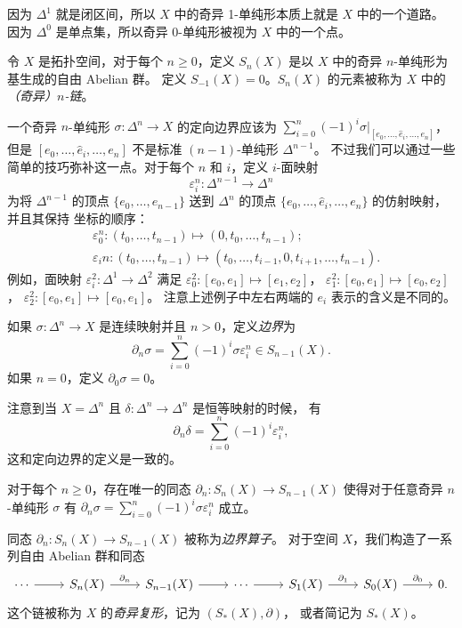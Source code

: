 \documentclass[fontset=none]{Notes}
\begin{document}
因为 $\Delta^1$ 就是闭区间，所以 $X$ 中的奇异 1-单纯形本质上就是 $X$
中的一个道路。因为 $\Delta^0$ 是单点集，所以奇异 0-单纯形被视为 $X$
中的一个点。

\begin{definition}
  令 $X$ 是拓扑空间，对于每个 $n\geq 0$，定义 $S_n(X)$
  是以 $X$ 中的奇异 $n$-单纯形为基生成的自由 Abelian 群。
  定义 $S_{-1}(X)=0$。$S_n(X)$ 的元素被称为 $X$
  中的\emph{（奇异）$n$-链}。
\end{definition}

一个奇异 $n$-单纯形 $\sigma:\Delta^n\to X$ 的定向边界应该为
$\sum_{i=0}^n(-1)^i\sigma|_{[e_0,\dots,\hat e_i,\dots,e_n]}$，
但是 $[e_0,\dots,\hat e_i,\dots,e_n]$ 不是标准 $(n-1)$-单纯形 $\Delta^{n-1}$。
不过我们可以通过一些简单的技巧弥补这一点。对于每个 $n$ 和 $i$，定义
$i$-面映射
\[
  \varepsilon_i^n:\Delta^{n-1}\to \Delta^n 
\]
为将 $\Delta^{n-1}$ 的顶点 $\{e_0,\dots,e_{n-1}\}$ 送到 $\Delta^n$
的顶点 $\{e_0,\dots,\hat e_i,\dots,e_n\}$ 的仿射映射，并且其保持
坐标的顺序：
\begin{align*}
  &\varepsilon_0^n:(t_0,\dots,t_{n-1})\mapsto (0,t_0,\dots,t_{n-1});\\
  &\varepsilon_in:(t_0,\dots,t_{n-1})\mapsto (t_0,\dots,t_{i-1},0,t_{i+1},\dots,t_{n-1}).
\end{align*}
例如，面映射 $\varepsilon_i^2:\Delta^1\to \Delta^2$ 满足
$\varepsilon_0^2:[e_0,e_1]\mapsto [e_1,e_2]$，
$\varepsilon_1^2:[e_0,e_1]\mapsto [e_0,e_2]$，
$\varepsilon_2^2:[e_0,e_1]\mapsto [e_0,e_1]$。
注意上述例子中左右两端的 $e_i$ 表示的含义是不同的。

\begin{definition}
  如果 $\sigma:\Delta^n\to X$ 是连续映射并且 $n>0$，定义\emph{边界}为
  \[
    \partial_n\sigma=\sum_{i=0}^n (-1)^i\sigma\varepsilon_i^n\in S_{n-1}(X).
  \]
  如果 $n=0$，定义 $\partial_0\sigma=0$。
\end{definition}

注意到当 $X=\Delta^n$ 且 $\delta:\Delta^n\to\Delta^n$ 是恒等映射的时候，
有
\[
  \partial_n\delta=\sum_{i=0}^{n} (-1)^i\varepsilon_i^n,
\]
这和定向边界的定义是一致的。

\begin{theorem}
  对于每个 $n\geq 0$，存在唯一的同态 $\partial_n:S_n(X)\to S_{n-1}(X)$
  使得对于任意奇异 $n$-单纯形 $\sigma$ 有 
  $\partial_n\sigma=\sum_{i=0}^n(-1)^i\sigma\varepsilon_i^n$ 成立。
\end{theorem}

同态 $\partial_n:S_n(X)\to S_{n-1}(X)$ 被称为\emph{边界算子}。
对于空间 $X$，我们构造了一系列自由 Abelian 群和同态
\[
  \begin{tikzcd}
    \cdots\arrow[r] & S_n(X)\arrow[r,"\partial_n"] & S_{n-1}(X)
    \arrow[r] & \cdots\arrow[r] & S_1(X)\arrow[r,"\partial_1"]
    & S_0(X)\arrow[r,"\partial_0"] & 0.
  \end{tikzcd}
\]
这个链被称为 $X$ 的\emph{奇异复形}，记为 $(S_*(X),\partial)$，
或者简记为 $S_*(X)$。
\end{document}
